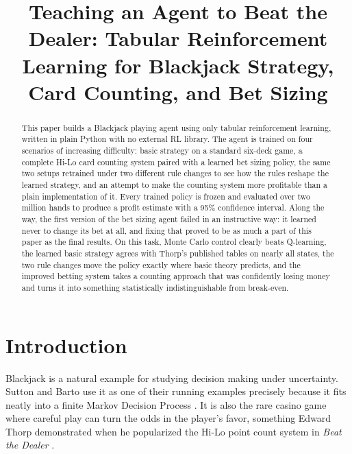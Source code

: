 \documentclass[conference,a4paper]{IEEEtran}
\begin{document}
\title{Teaching an Agent to Beat the Dealer: Tabular Reinforcement Learning for Blackjack Strategy, Card Counting, and Bet Sizing}

\author{
}

\maketitle

\begin{abstract}
This paper builds a Blackjack playing agent using only tabular reinforcement learning, written in plain Python with no external RL library. The agent is trained on four scenarios of increasing difficulty: basic strategy on a standard six-deck game, a complete Hi-Lo card counting system paired with a learned bet sizing policy, the same two setups retrained under two different rule changes to see how the rules reshape the learned strategy, and an attempt to make the counting system more profitable than a plain implementation of it. Every trained policy is frozen and evaluated over two million hands to produce a profit estimate with a 95\% confidence interval. Along the way, the first version of the bet sizing agent failed in an instructive way: it learned never to change its bet at all, and fixing that proved to be as much a part of this paper as the final results. On this task, Monte Carlo control clearly beats Q-learning, the learned basic strategy agrees with Thorp's published tables on nearly all states, the two rule changes move the policy exactly where basic theory predicts, and the improved betting system takes a counting approach that was confidently losing money and turns it into something statistically indistinguishable from break-even.
\end{abstract}

\section{Introduction}
Blackjack is a natural example for studying decision making under uncertainty. Sutton and Barto use it as one of their running examples precisely because it fits neatly into a finite Markov Decision Process \cite{suttonbarto}. It is also the rare casino game where careful play can turn the odds in the player's favor, something Edward Thorp demonstrated when he popularized the Hi-Lo point count system in \emph{Beat the Dealer} \cite{thorp}.
\end{document}
